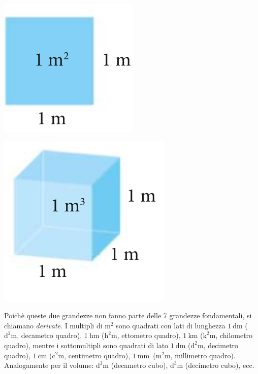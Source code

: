 \documentclass[12pt,a4paper,oneside]{book}
\theoremstyle{esercizio}
\begin{document}
\begin{minipage}{\linewidth}
	\centering
	\includegraphics[scale=0.3]{quad}
	\label{fig:quad}
\end{minipage}
\begin{minipage}{\linewidth}
	\centering
	\includegraphics[scale=0.3]{cub}
	\label{fig:cub}
\end{minipage}


Poichè queste due grandezze non fanno parte delle 7 grandezze fondamentali, si chiamano \textit{derivate}. I multipli di \(\si{\square\meter}\) sono quadrati con lati di lunghezza \(\SI{1}{\deca\meter}\) (\(\si{\square\deca\meter}\), decametro quadro), \(\SI{1}{\hecto\meter}\) (\(\si{\square\hecto\meter}\), ettometro quadro), \(\SI{1}{\kilo\meter}\) (\(\si{\square\kilo\meter}\), chilometro quadro), mentre i sottomultipli sono quadrati di lato \(\SI{1}{\deci\meter}\) (\(\si{\square\deci\meter}\), decimetro quadro), \(\SI{1}{\centi\meter}\) (\(\si{\square\centi\meter}\), centimetro quadro), \(\SI{1}{\milli\meter}\)\ (\(\si{\square\milli\meter}\), millimetro quadro). Analogamente per il volume: \(\si{\cubic\deca\meter}\) (decametro cubo), \(\si{\cubic\deci\meter}\) (decimetro cubo), ecc.
\end{document}
